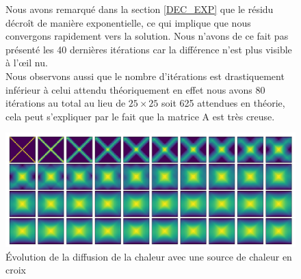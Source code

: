 \documentclass{article}
\begin{document}
\begin{figure}[H]
  \begin{minipage}{0.5\textwidth}
    Nous avons remarqué dans la section \ref{DEC_EXP} que le résidu décroît de manière exponentielle, ce qui implique que nous convergons rapidement vers la solution. Nous n'avons de ce fait pas présenté les 40 dernières itérations car la différence n'est plus visible à l'œil nu.\\
    Nous observons aussi que le nombre d'itérations est drastiquement inférieur à celui attendu théoriquement en effet nous avons 80 itérations au total au lieu de \(25 \times 25\) soit 625 attendues en théorie, cela peut s'expliquer par le fait que la matrice A est très creuse.
  \end{minipage}
  \hfill
  \begin{minipage}{0.45\textwidth}
    \includegraphics[width=\textwidth]{img/croixevol.png}
    \caption{Évolution de la diffusion de la chaleur avec une source de chaleur en croix}
    \label{fig:diff_1src_evole}
    
  \end{minipage}
\end{figure}
\end{document}
